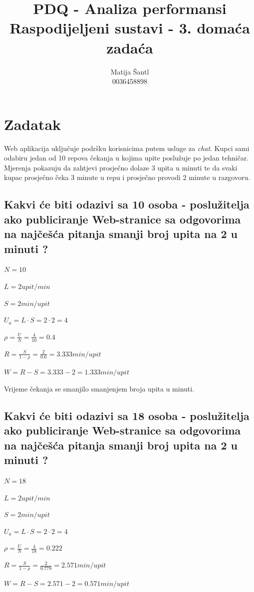 \documentclass[11pt]{article}
\title{\textbf{PDQ - Analiza performansi}\\
		Raspodijeljeni sustavi - 3. domaća zadaća}
\author{Matija Šantl \\
		0036458898}
\date{}
\begin{document}
\maketitle

\section{Zadatak}
Web aplikacija uključuje podršku korisnicima putem usluge za \emph{chat}. Kupci sami odabiru jedan od 10 repova čekanja u kojima upite poslužuje po jedan tehničar. Mjerenja pokazuju da zahtjevi prosječno dolaze 3 upita u minuti te da svaki kupac prosječno čeka 3 minute u repu i prosječno provodi 2 minute u razgovoru.

\subsection{Kakvi će biti odazivi sa 10 osoba - poslužitelja ako publiciranje Web-stranice sa odgovorima na najčešća pitanja smanji broj upita na 2 u minuti ?}

$N =10$

$L = 2 upit / min$

$S = 2 min / upit$

$U_a = L \cdot S = 2 \cdot 2 = 4$

$\rho = \frac{U}{N} = \frac{4}{10} = 0.4$

$R = \frac{S}{1 - \rho} = \frac{2}{0.6} = 3.333 min / upit$

$W = R - S = 3.333 - 2 = 1.333 min / upit$

Vrijeme čekanja se smanjilo smanjenjem broja upita u minuti. 

\subsection{Kakvi će biti odazivi sa 18 osoba - poslužitelja ako publiciranje Web-stranice sa odgovorima na najčešća pitanja smanji broj upita na 2 u minuti ?}

$N =18$

$L = 2 upit / min$

$S = 2 min / upit$

$U_a = L \cdot S = 2 \cdot 2 = 4$

$\rho = \frac{U}{N} = \frac{4}{18} = 0.222$

$R = \frac{S}{1 - \rho} = \frac{2}{0.778} = 2.571 min / upit$

$W = R - S = 2.571 - 2 = 0.571 min / upit$
\end{document}
